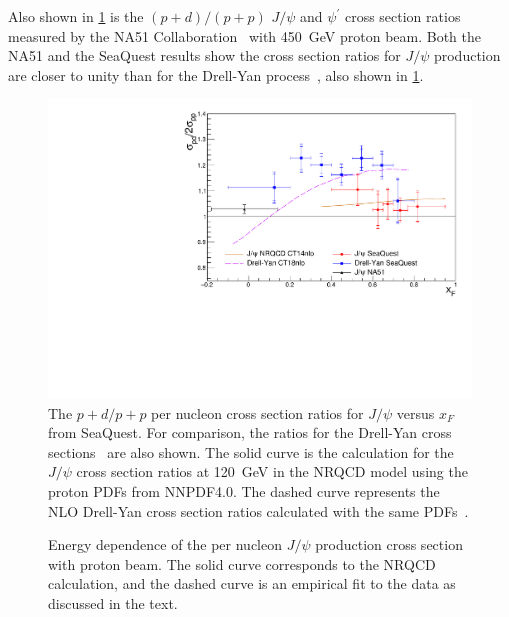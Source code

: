 \documentclass[reprint,aps,unsortedaddress,superscriptaddress,prl,floatfix,showpacs,linenumbers]{revtex4-2}
\begin{document}
Also shown in \cref{fig:pdpp} is the $(p+d)/(p+p)$ $J/\psi$
and $\psi^\prime$ cross section
ratios measured by the NA51 Collaboration~\cite{abreu1998} with \SI{450}{\GeV} proton
beam. Both the NA51 and the SeaQuest
results show the cross section ratios for $J/\psi$
production are closer to unity than for
the Drell-Yan process~\cite{dove2023}, also
shown in \cref{fig:pdpp}.

\begin{figure}[tb]
	\includegraphics*[width=\linewidth]{crossSections/xF/pdpp_xF}
	\caption{The $p+d/p+p$ per nucleon cross section ratios for $J/\psi$
		versus $x_F$ from SeaQuest.
		For comparison, the ratios for the Drell-Yan cross sections~\cite{dove2023} are
		also shown. The solid curve is the calculation for the $J/\psi$ cross section
		ratios at \SI{120}{\GeV} in the NRQCD model using the proton PDFs from NNPDF4.0.
		The dashed curve represents the NLO Drell-Yan cross section ratios
		calculated with the same PDFs~\cite{dove2023}.}
	\label{fig:pdpp}
\end{figure}

\begin{figure}[tb]
	\caption{Energy dependence of the per nucleon $J/\psi$ production
		cross section with proton beam. The solid curve corresponds to the NRQCD
		calculation, and the dashed curve is an empirical fit to the data
		as discussed in the text.}
	\label{fig5}
\end{figure}
\end{document}
